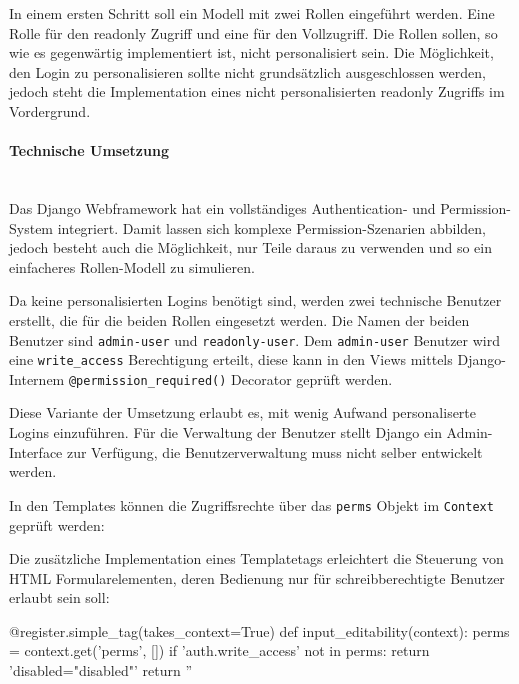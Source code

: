 In einem ersten Schritt soll ein Modell mit zwei Rollen eingeführt werden. Eine
Rolle für den readonly Zugriff und eine für den Vollzugriff. Die Rollen sollen,
so wie es gegenwärtig implementiert ist, nicht personalisiert sein. Die
Möglichkeit, den Login zu personalisieren sollte nicht grundsätzlich
ausgeschlossen werden, jedoch steht die Implementation eines nicht
personalisierten readonly Zugriffs im Vordergrund.

\paragraph{Technische Umsetzung} \hspace{0pt} \\
Das Django Webframework hat ein vollständiges Authentication- und
Permission-System integriert. Damit lassen sich komplexe Permission-Szenarien
abbilden, jedoch besteht auch die Möglichkeit, nur Teile daraus zu verwenden und
so ein einfacheres Rollen-Modell zu simulieren.

Da keine personalisierten Logins benötigt sind, werden zwei technische Benutzer
erstellt, die für die beiden Rollen eingesetzt werden. Die Namen der beiden Benutzer sind 
 \texttt{admin-user} und \texttt{readonly-user}. Dem
\texttt{admin-user} Benutzer wird eine \texttt{write\_access} Berechtigung erteilt, diese
kann in den Views mittels Django-Internem \texttt{@permission\_required()}
Decorator geprüft werden.

Diese Variante der Umsetzung erlaubt es, mit wenig Aufwand personaliserte Logins
einzuführen. Für die Verwaltung der Benutzer stellt Django ein Admin-Interface
zur Verfügung, die Benutzerverwaltung muss nicht selber entwickelt werden.

In den Templates können die Zugriffsrechte über das \texttt{perms} Objekt im
\texttt{Context} geprüft werden:


Die zusätzliche Implementation eines Templatetags erleichtert die Steuerung von
HTML Formularelementen, deren Bedienung nur für schreibberechtigte Benutzer
erlaubt sein soll:

\begin{pythoncode}
@register.simple_tag(takes_context=True)
def input_editability(context):
    perms = context.get('perms', [])
    if 'auth.write_access' not in perms:
        return 'disabled="disabled"'
    return ''
\end{pythoncode}

